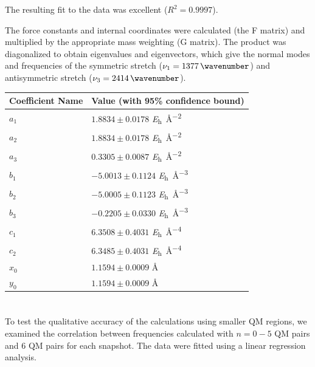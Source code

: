 The resulting fit to the data was excellent (\(R^2 = 0.9997\)).

The force constants and internal coordinates were calculated (the F matrix) and multiplied by the appropriate mass weighting (G matrix). The product was diagonalized to obtain eigenvalues and eigenvectors, which give the normal modes and frequencies of the symmetric stretch (\(\nu_{1} = \SI{1377}{\wavenumber}\)) and antisymmetric stretch (\(\nu_{3} = \SI{2414}{\wavenumber}\)).

\begin{table}
  \centering
  \caption{Best fit parameters for DVR representation of the gas phase  potential energy surface.}
  \label{paper_02:tab:S5}
  \begin{longtable}[]{@{}ll@{}}
    \toprule
    Coefficient Name & Value (with 95\% confidence bound)\tabularnewline
    \midrule
    \endhead
    \(a_1\) & \(1.8834 \pm 0.0178\) \si{\hartree\per\angstrom\squared}\tabularnewline
    \(a_2\) & \(1.8834 \pm 0.0178\) \si{\hartree\per\angstrom\squared}\tabularnewline
    \(a_3\) & \(0.3305 \pm 0.0087\) \si{\hartree\per\angstrom\squared}\tabularnewline
    \(b_1\) & \(-5.0013 \pm 0.1124\) \si{\hartree\per\angstrom\cubed}\tabularnewline
    \(b_2\) & \(-5.0005 \pm 0.1123\) \si{\hartree\per\angstrom\cubed}\tabularnewline
    \(b_3\) & \(-0.2205 \pm 0.0330\) \si{\hartree\per\angstrom\cubed}\tabularnewline
    \(c_1\) & \(6.3508 \pm 0.4031\) \si{\hartree\per\angstrom\tothe{4}}\tabularnewline
    \(c_2\) & \(6.3485 \pm 0.4031\) \si{\hartree\per\angstrom\tothe{4}}\tabularnewline
    \(x_0\) & \(1.1594 \pm 0.0009\) \si{\angstrom}\tabularnewline
    \(y_0\) & \(1.1594 \pm 0.0009\) \si{\angstrom}\tabularnewline
    \bottomrule
  \end{longtable}
\end{table}

\section{}
\label{paper_02:sec:SVI}

To test the qualitative accuracy of the calculations using smaller QM regions, we examined the correlation between frequencies calculated with \(n = 0-5\) QM pairs and \num{6} QM pairs for each snapshot. The data were fitted using a linear regression analysis.

